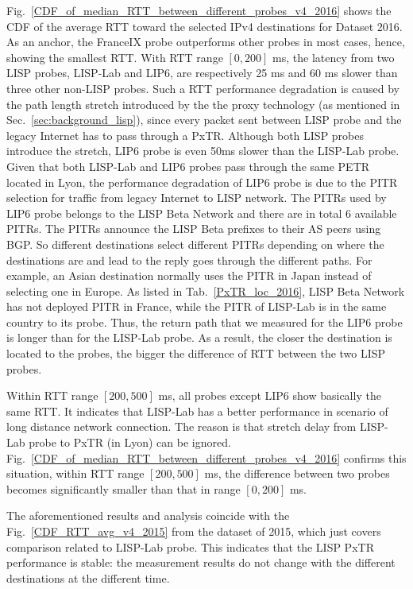 Fig.~\ref{CDF_of_median_RTT_between_different_probes_v4_2016} shows the CDF of the average RTT toward the selected IPv4 destinations for Dataset 2016. %
As an anchor, the FranceIX probe outperforms other probes in most cases, hence, showing the smallest RTT. With RTT range $[0, 200]$ ms, the latency from two LISP probes, LISP-Lab and LIP6, are respectively 25 ms and 60 ms slower than three other non-LISP probes. Such a RTT performance degradation is caused by the path length stretch introduced by the the proxy technology (as mentioned in Sec.~\ref{sec:background_lisp}), since every packet sent between LISP probe and the legacy Internet has to pass through a PxTR. Although both LISP probes introduce the stretch, LIP6 probe is even 50ms slower than the LISP-Lab probe. Given that both LISP-Lab and LIP6 probes pass through the same PETR located in Lyon, the performance degradation of LIP6 probe is due to the PITR selection for traffic from legacy Internet to LISP network. The PITRs used by LIP6 probe belongs to the LISP Beta Network and there are in total 6 available PITRs. The PITRs announce the LISP Beta prefixes to their AS peers using BGP. So different destinations select different PITRs depending on where the destinations are and lead to the reply goes through the different paths. For example, an Asian destination normally uses the PITR in Japan instead of selecting one in Europe. As listed in Tab.~\ref{PxTR_loc_2016}, LISP Beta Network has not deployed PITR in France, while the PITR of LISP-Lab is in the same country to its probe. Thus, the return path that we measured for the LIP6 probe is longer than for the LISP-Lab probe. As a result, the closer the destination is located to the probes, the bigger the difference of RTT between the two LISP probes.

Within RTT range $[200, 500]$ ms, all probes except LIP6 show basically the same RTT. It indicates that LISP-Lab has a better performance in scenario of long distance network connection. The reason is that stretch delay from LISP-Lab probe to PxTR (in Lyon) can be ignored. Fig.~\ref{CDF_of_median_RTT_between_different_probes_v4_2016} confirms this situation, within RTT range $[200, 500]$ ms, the difference between two probes becomes significantly smaller than that in range $[0, 200]$ ms.

The aforementioned results and analysis coincide with the Fig.~\ref{CDF_RTT_avg_v4_2015} from the dataset of 2015, which just covers comparison related to LISP-Lab probe. This indicates that the LISP PxTR performance is stable: the measurement results do not change with the different destinations at the different time. 

